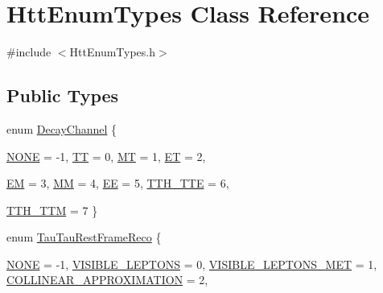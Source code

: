 \hypertarget{classHttEnumTypes}{
\section{HttEnumTypes Class Reference}
\label{classHttEnumTypes}
}


{\ttfamily \#include $<$HttEnumTypes.h$>$}\subsection*{Public Types}
\begin{DoxyCompactItemize}
\item 
enum \hyperlink{classHttEnumTypes_a5e7e80b023df2c06dfd1e9c08f6efb35}{DecayChannel} \{ \par
\hyperlink{classHttEnumTypes_a6d52b15105995df93610454d88c598f0ae6a48243112654c40cd04a51396e999f}{NONE} =  -\/1, 
\hyperlink{classHttEnumTypes_a5e7e80b023df2c06dfd1e9c08f6efb35aec084e53e58df29fac0ab6089796d949}{TT} =  0, 
\hyperlink{classHttEnumTypes_a5e7e80b023df2c06dfd1e9c08f6efb35a4ce77d82ce5b9937af3e3aacf482b53e}{MT} =  1, 
\hyperlink{classHttEnumTypes_a5e7e80b023df2c06dfd1e9c08f6efb35a400151999d05508468a3eba63eba82f3}{ET} =  2, 
\par
\hyperlink{classHttEnumTypes_a5e7e80b023df2c06dfd1e9c08f6efb35ad777e5c306bd8b99e95667a046d4290c}{EM} =  3, 
\hyperlink{classHttEnumTypes_a5e7e80b023df2c06dfd1e9c08f6efb35af26aa7eb4828b5d252936f588aa1ba2a}{MM} =  4, 
\hyperlink{classHttEnumTypes_a5e7e80b023df2c06dfd1e9c08f6efb35a9021eefce5cd72e8981025c2aa8b8d71}{EE} =  5, 
\hyperlink{classHttEnumTypes_a5e7e80b023df2c06dfd1e9c08f6efb35a524472e9caac345f022abe13541a3f13}{TTH\_\-TTE} =  6, 
\par
\hyperlink{classHttEnumTypes_a5e7e80b023df2c06dfd1e9c08f6efb35aaaa53f6622646c4b57a64e9c2d70b015}{TTH\_\-TTM} =  7
 \}
\item 
enum \hyperlink{classHttEnumTypes_add21b4b1cefbea05ecb244d1b72f52e7}{TauTauRestFrameReco} \{ \par
\hyperlink{classHttEnumTypes_a6d52b15105995df93610454d88c598f0ae6a48243112654c40cd04a51396e999f}{NONE} =  -\/1, 
\hyperlink{classHttEnumTypes_add21b4b1cefbea05ecb244d1b72f52e7a06c70159c7b1ac66f04cbc5e9ffbe8e2}{VISIBLE\_\-LEPTONS} =  0, 
\hyperlink{classHttEnumTypes_add21b4b1cefbea05ecb244d1b72f52e7a1eef6fd5ff3e75bd1aceb220dace84f7}{VISIBLE\_\-LEPTONS\_\-MET} =  1, 
\hyperlink{classHttEnumTypes_add21b4b1cefbea05ecb244d1b72f52e7a321eb45208d43e5ba6865c736c7a4f06}{COLLINEAR\_\-APPROXIMATION} =  2, 
\par

\end{DoxyCompactItemize}
